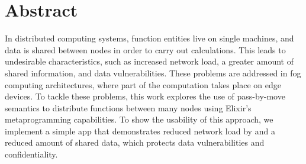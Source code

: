 
\chapter{Abstract}

In distributed computing systems, function entities live on single machines, and data is shared between nodes in order to 
carry out calculations. This leads to undesirable characteristics,
such as increased network load, a greater amount of shared information, and data vulnerabilities. These problems are addressed in fog computing architectures, where part of the computation takes place on edge devices. To tackle these problems, this work explores the use of pass-by-move semantics to distribute functions between many nodes using Elixir's metaprogramming capabilities. To show the usability of this approach, we implement a simple app that demonstrates reduced network load by and a reduced amount of shared data, which protects data vulnerabilities and confidentiality.


\endinput

